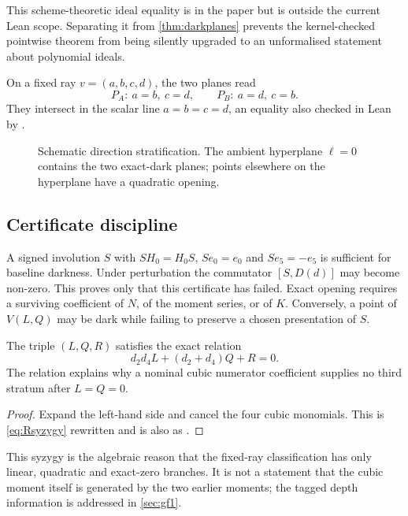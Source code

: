 This scheme-theoretic ideal equality is  in the paper but is
outside the current Lean scope.  Separating it from
\cref{thm:darkplanes} prevents the kernel-checked pointwise theorem from being
silently upgraded to an unformalised statement about polynomial ideals.

On a fixed ray $v=(a,b,c,d)$, the two planes read
\begin{equation}
P_A:\ a=b,\ c=d,\qquad P_B:\ a=d,\ c=b.
\end{equation}
They intersect in the scalar line $a=b=c=d$, an equality also checked in Lean
by .

\begin{figure}[ht]
\centering
\caption{Schematic direction stratification.  The ambient hyperplane
\(\ell=0\) contains the two exact-dark planes; points elsewhere on the
hyperplane have a quadratic opening.}
\label{fig:darkstrata}
\end{figure}

\subsection{Certificate discipline}

A signed involution $S$ with $SH_0=H_0S$, $Se_0=e_0$ and
$Se_5=-e_5$ is sufficient for baseline darkness.  Under perturbation the
commutator \([S,D(d)]\) may become non-zero.  This proves only that this
certificate has failed.  Exact opening requires a surviving coefficient of
$N$, of the moment series, or of $K$.  Conversely, a point of $V(L,Q)$
may be dark while failing to preserve a chosen presentation of $S$.

\begin{proposition}\label{prop:syzygy}
The triple \((L,Q,R)\) satisfies the exact relation
\[
d_2d_4L+(d_2+d_4)Q+R=0.
\]
The relation explains why a nominal cubic numerator coefficient supplies no
third stratum after $L=Q=0$.
\end{proposition}

\begin{proof}
Expand the left-hand side and cancel the four cubic monomials.  This is
\cref{eq:Rsyzygy} rewritten and is also  as
.
\end{proof}

This syzygy is the algebraic reason that the fixed-ray classification has only
linear, quadratic and exact-zero branches.  It is not a statement that the
cubic moment itself is generated by the two earlier moments; the tagged depth
information is addressed in \cref{sec:gf1}.
